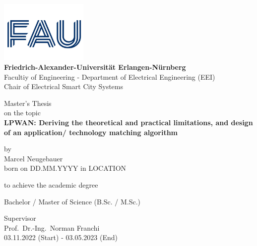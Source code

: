 
\begin{titlepage}

			\vspace{0.5cm}
			
			\begin{center}
			
				\includegraphics[height=3cm]{img/titlepage_LT/FAU_only_logo} \\
				\large{\textbf{Friedrich-Alexander-Universität Erlangen-Nürnberg}}\\
				\large{Facultiy of Engineering} -
				\large{Department of Electrical Engineering (EEI)} \\
				\large{Chair of Electrical Smart City Systems} \\			
			
				\vspace{7mm}
				
				\LARGE{Master's Thesis} \\
				\normalsize{on the topic}\\
				
				\vspace{5mm}
				\Large{\textbf{LPWAN: Deriving the theoretical and practical limitations, and design of an application/ technology matching algorithm}\\}			

				\vspace{5mm}

				\normalsize{by}\\

				\vspace{5mm}
	            \Large{Marcel Neugebauer} \\
	            \normalsize{born on DD.MM.YYYY in LOCATION} \\
	            
				\vspace{7mm}
				
				\normalsize{to achieve the academic degree}
				
				\large{Bachelor / Master of Science (B.Sc. / M.Sc.)}
				
				\vspace{12mm}	
			
			\vfill
			\large
			Supervisor\\
			{Prof.~Dr.-Ing.~Norman Franchi} \\
			\vspace{3mm}
			{03.11.2022 (Start)} - {03.05.2023} (End) \\			
			
			\end{center}
	\end{titlepage}%

